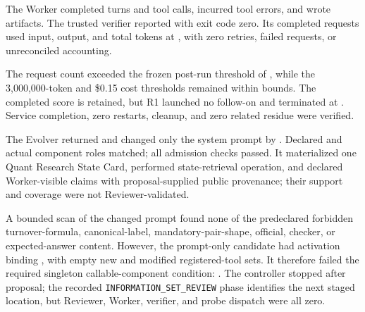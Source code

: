  The Worker completed
\HoldingsHZeroTurns{} turns and \HoldingsHZeroToolCalls{} tool calls, incurred
\HoldingsHZeroToolErrors{} tool errors, and wrote \HoldingsHZeroArtifacts{}
artifacts. The trusted verifier reported \HoldingsHZeroOfficial{} with exit
code zero. Its \HoldingsHZeroRequests{} completed requests used
\HoldingsHZeroInputTokens{} input, \HoldingsHZeroOutputTokens{} output, and
\HoldingsHZeroTotalTokens{} total tokens at \HoldingsHZeroCost{}, with zero
retries, failed requests, or unreconciled accounting.

The request count exceeded the frozen post-run threshold of
\HoldingsHZeroRequestThreshold{}, while the 3,000,000-token and \$0.15 cost
thresholds remained within bounds. The completed score is retained, but R1
launched no follow-on and terminated at \HoldingsHZeroDecision{}. Service
completion, zero restarts, cleanup, and zero related residue were verified.


 The Evolver returned \HoldingsProposalDecision{} and changed only the
system prompt by \HoldingsProposalMutation{}. Declared and actual component
roles matched; all \HoldingsProposalAdmission{} admission checks passed. It
materialized one Quant Research State Card, performed
\HoldingsProposalStateRetrieval{} state-retrieval operation, and declared
\HoldingsProposalClaims{} Worker-visible claims with proposal-supplied public
provenance; their support and coverage were not Reviewer-validated.

A bounded scan of the changed prompt found none of the predeclared forbidden
turnover-formula, canonical-label, mandatory-pair-shape, official, checker, or
expected-answer content. However, the prompt-only candidate had activation
binding \HoldingsProposalBinding{}, with empty new and modified registered-tool
sets. It therefore failed the required singleton callable-component condition:
\HoldingsProposalStop{}. The controller stopped after proposal; the recorded
\texttt{INFORMATION\_SET\_REVIEW} phase identifies the next staged location,
but Reviewer, Worker, verifier, and probe dispatch were all zero.

